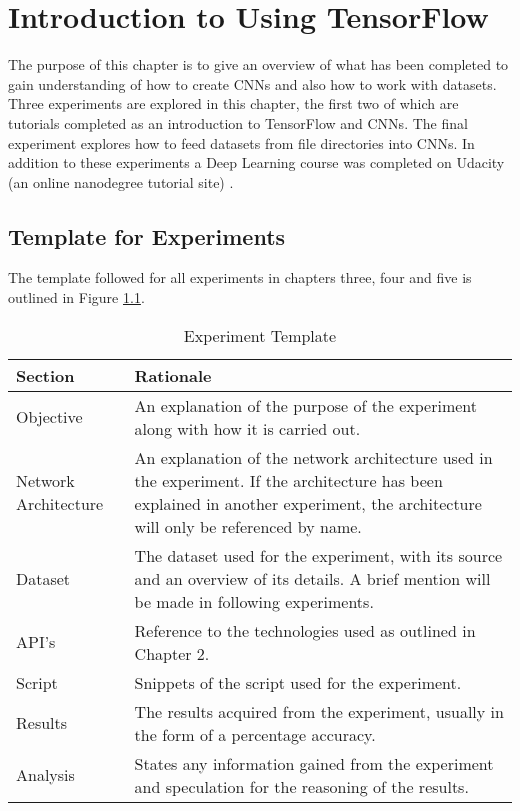 \chapter{Introduction to Using TensorFlow}
The purpose of this chapter is to give an overview of what has been completed to gain understanding of how to create CNNs and also how to work with datasets.
Three experiments are explored in this chapter, the first two of which are tutorials completed as an introduction to TensorFlow and CNNs.
The final experiment explores how to feed datasets from file directories into CNNs.
In addition to these experiments a Deep Learning course was completed on Udacity (an online nanodegree tutorial site) \parencite{udacity}.

\section{Template for Experiments}
The template followed for all experiments in chapters three, four and five is outlined in Figure \ref{fig:expTemplate}.

\begin{table}[]
\centering
\caption{Experiment Template}
\label{fig:expTemplate}
\begin{tabular}{|p{4cm}|p{11cm}|}
\hline
\textbf{Section}   & \textbf{Rationale}                \\ \hline
Objective             & An explanation of the purpose of the experiment along with how it is carried out. \\ \hline
Network Architecture & An explanation of the network architecture used in the experiment. If the architecture has been explained in another experiment, the architecture will only be referenced by name.                       \\ \hline
Dataset              & The dataset used for the experiment, with its source and an overview of its details. A brief mention will be made in following experiments.                       \\ \hline
API's                & Reference to the technologies used as outlined in Chapter 2.                      \\ \hline
Script               & Snippets of the script used for the experiment.                       \\ \hline
Results              & The results acquired from the experiment, usually in the form of a percentage accuracy.                       \\ \hline
Analysis   & States any information gained from the experiment and speculation for the reasoning of the results.                      \\ \hline
\end{tabular}
\end{table}

